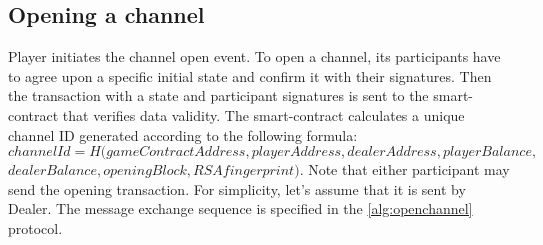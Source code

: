 \subsection {Opening a channel}
Player initiates the channel open event. To open a channel, its participants have to agree upon a specific initial state and confirm it with their signatures. Then the transaction with a state and participant signatures is sent to the smart-contract that verifies data validity. The smart-contract calculates a unique channel ID generated according to the following formula:\\
 $channelId = H(gameContractAddress, playerAddress,dealerAddress, playerBalance, $ \\ $ dealerBalance, openingBlock, RSAfingerprint)$. Note that either participant may send the opening transaction. For simplicity, let’s assume that it is sent by Dealer. The message exchange sequence is specified in the  \autoref {alg:openchannel} protocol.

